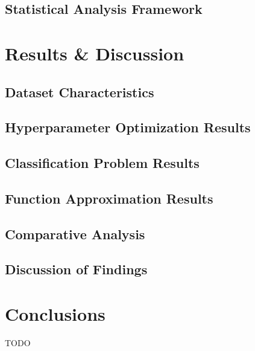 \documentclass[10pt, conference]{IEEEtran}
\begin{document}
\subsection{Statistical Analysis Framework}

\section{Results \& Discussion}
\subsection{Dataset Characteristics}

\subsection{Hyperparameter Optimization Results}

\subsection{Classification Problem Results}

\subsection{Function Approximation Results}

\subsection{Comparative Analysis}

\subsection{Discussion of Findings}

\section{Conclusions}
TODO



\end{document}
